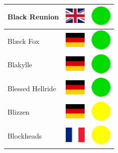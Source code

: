 \documentclass[12pt, a4paper, twoside]{report}
\begin{document}
\begin{center}
\begin{longtable}{|p{5cm}|p{2cm}|p{2cm}|}
 Black Reunion                                              & \includegraphics[width=1cm]{../img/flags/gb} &   \includegraphics[width=1cm]{../likes/y} \\ \hline
 Blæck Fox                                                  & \includegraphics[width=1cm]{../img/flags/de} &   \includegraphics[width=1cm]{../likes/y} \\ \hline
 Blakylle                                                   & \includegraphics[width=1cm]{../img/flags/de} &   \includegraphics[width=1cm]{../likes/y} \\ \hline
 Blessed Hellride                                           & \includegraphics[width=1cm]{../img/flags/de} &   \includegraphics[width=1cm]{../likes/y} \\ \hline
 Blizzen                                                    & \includegraphics[width=1cm]{../img/flags/de} &   \includegraphics[width=1cm]{../likes/m} \\ \hline
 Blockheads                                                 & \includegraphics[width=1cm]{../img/flags/fr} &   \includegraphics[width=1cm]{../likes/m} \\ \hline

\end{longtable}
\end{center}
\end{document}
